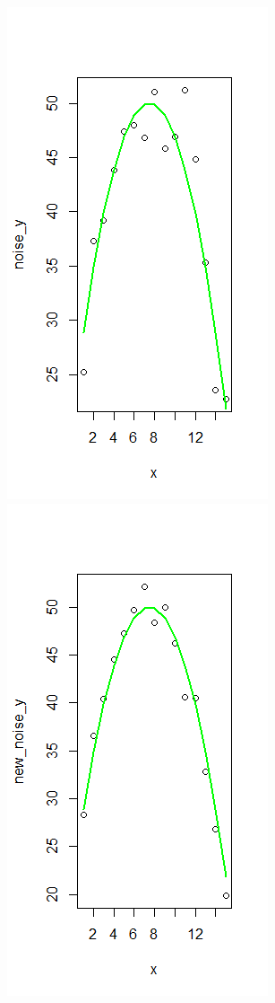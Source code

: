 \documentclass[12pt,twoside]{reedthesis}
\begin{document}
\includegraphics{figure/true.png} \includegraphics{figure/stayGood.png}
\end{document}
